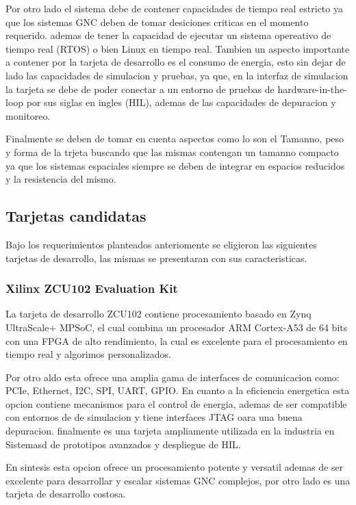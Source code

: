 Por otro lado el sistema debe de contener capacidades de tiempo real estricto ya que los sistemas GNC deben de tomar
desiciones criticas en el momento requerido. ademas de tener la capacidad de ejecutar un sistema opereativo de tiempo real
(RTOS) o bien Linux en tiempo real. Tambien un aspecto importante a contener por la tarjeta de desarrollo es el consumo de
energia, esto sin dejar de lado las capacidades de simulacion y pruebas, ya que, en la interfaz de simulacion la tarjeta se
debe de poder conectar a un entorno de pruebas de hardware-in-the-loop por sus siglas en ingles (HIL), ademas de las
capacidades de depuracion y monitoreo.

Finalmente se deben de tomar en cuenta aspectos como lo son el Tamanno, peso y forma de la trjeta buscando que las mismas contengan 
un tamanno compacto ya que los sistemas espaciales siempre se deben de integrar en espacios reducidos y la resistencia del mismo.

\subsection{Tarjetas candidatas}
Bajo los requerimientos planteados anteriomente se eligieron las siguientes tarjetas de desarrollo, las mismas se presentaran con sus
caracteristicas.

\subsubsection{Xilinx ZCU102 Evaluation Kit}

La tarjeta de desarrollo ZCU102 contiene procesamiento basado en Zynq UltraScale+ MPSoC, el cual combina un procesador ARM Cortex-A53 de 
64 bits con una FPGA de alto rendimiento, la cual es excelente para el procesamiento en tiempo real y algorimos personalizados.

Por otro aldo esta ofrece una amplia gama de interfaces de comunicacion como: PCIe, Ethernet, I2C, SPI, UART, GPIO. En cuanto a la eficiencia energetica esta opcion contiene mecanismos para el control de energia, ademas de ser compatible con entornos de 
de simulacion y tiene interfaces JTAG oara una buena depuracion. finalmente es una tarjeta ampliamente utilizada en la industria en Sistemasd
de prototipos avanzados y despliegue de HIL.

En sintesis esta opcion ofrece un procesamiento potente y versatil ademas de ser excelente para desarrollar y escalar sistemas GNC complejos, 
por otro lado es una tarjeta de desarrollo costosa.

